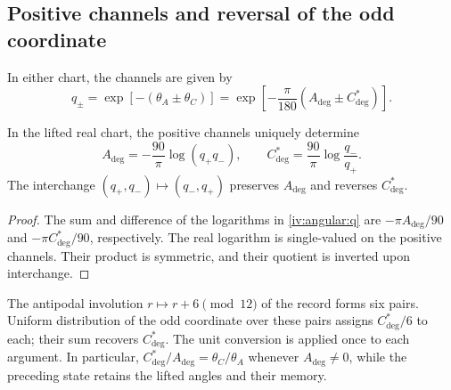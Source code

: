 \subsection{Positive channels and reversal of the odd coordinate}
\label{iv:angular:canales}

In either chart, the channels are given by
\begin{equation}
 q_\pm=\exp[-(\theta_A\pm\theta_C)]
 =\exp\!\left[-\frac{\pi}{180}
                   (A_{\deg}\pm C^*_{\deg})\right].
 \label{iv:angular:q}
\end{equation}

\begin{proposition}
\label{iv:angular:inversion}
In the lifted real chart, the positive channels uniquely determine
\begin{equation}
 A_{\deg}=-\frac{90}{\pi}\log(q_+q_-),\qquad
 C^*_{\deg}=\frac{90}{\pi}\log\frac{q_-}{q_+}.
 \label{iv:angular:recuperacion}
\end{equation}
The interchange \((q_+,q_-)\mapsto(q_-,q_+)\) preserves
\(A_{\deg}\) and reverses \(C^*_{\deg}\).
\end{proposition}
\begin{proof}
The sum and difference of the logarithms in
\eqref{iv:angular:q} are \(-\pi A_{\deg}/90\) and
\(-\pi C^*_{\deg}/90\), respectively. The real logarithm
is single-valued on the positive channels. Their product is
symmetric, and their quotient is inverted upon interchange.
\end{proof}

The antipodal involution \(r\mapsto r+6\pmod {12}\) of the
record forms six pairs. Uniform distribution of the odd
coordinate over these pairs assigns \(C^*_{\deg}/6\) to each;
their sum recovers \(C^*_{\deg}\). The unit conversion is
applied once to each argument. In particular,
\(C^*_{\deg}/A_{\deg}=\theta_C/\theta_A\) whenever
\(A_{\deg}\ne0\), while the preceding state retains the
lifted angles and their memory.
